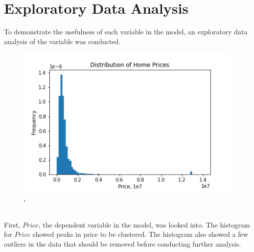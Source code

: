 \documentclass[12pt]{report}
\begin{document}
\section*{Exploratory Data Analysis}
To demonstrate the usefulness of each variable in the model, an exploratory data analysis of the variable was conducted. 
\begin{figure}[h]
\begin{center}
\includegraphics[width=130mm]{priceHist.png}
\end{center}
\caption{\textbf{.}}
\label{fig:priceHist}
\end{figure}
\\
First, $Price$, the dependent variable in the model, was looked into. The histogram for $Price$ showed peaks in price to be clustered. The histogram also showed a few outliers in the data that should be removed before conducting further analysis. 
\end{document}
